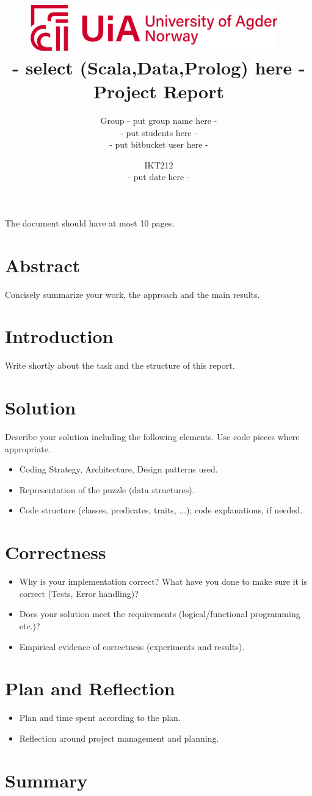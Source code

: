 \documentclass[12pt]{article}
\title{\includegraphics[width=0.8\textwidth]{uia-logo.png}~\\[1cm]
- select (Scala,Data,Prolog) here - Project Report}
\date{IKT212\\
- put date here -}
\author{Group - put group name here -\\
- put students here -\\
- put bitbucket user here -}
\begin{document}
\maketitle

\noindent The document should have at most 10 pages.

\section*{Abstract}
Concisely summarize your work, the approach and the main results.

\section{Introduction}
Write shortly about the task and the structure of this report. 

\section{Solution}
Describe your solution including the following elements. Use code pieces where appropriate.
\begin{itemize}
\item Coding Strategy, Architecture, Design patterns used.
\item Representation of the puzzle (data structures).
\item Code structure (classes, predicates, traits, ...); code explanations, if needed.
\end{itemize}

\section{Correctness}
\begin{itemize}
\item Why is your implementation correct? What have you done to make sure it is correct (Tests, Error handling)?
\item Does your solution meet the requirements (logical/functional programming etc.)?
\item Empirical evidence of correctness (experiments and results). 
\end{itemize}

\section{Plan and Reflection}
\begin{itemize}
\item Plan and time spent according to the plan.
\item Reflection around project management and planning.
\end{itemize}

\section{Summary}
\end{document}
